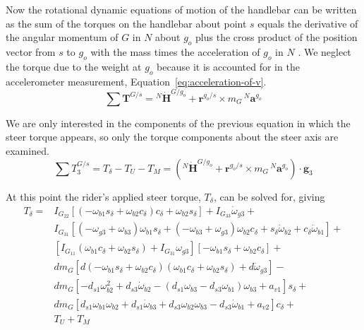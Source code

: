 \documentclass[10pt]{article}
\begin{document}
Now the rotational dynamic equations of motion of the handlebar can be written
as the sum of the torques on the handlebar about point $s$ equals the
derivative of the angular momentum of $G$ in $N$ about $g_o$ plus the cross
product of the position vector from $s$ to $g_o$ with the mass times the
acceleration of $g_o$ in $N$ \cite{Meriam1975}. We neglect the torque due to
the weight at $g_o$ because it is accounted for in the accelerometer
measurement, Equation~\ref{eq:acceleration-of-v}.
%
\begin{equation}
  \sum \mathbf{T}^{G/s} = {}^N\dot{\mathbf{H}}^{G/g_o} +
    \mathbf{r}^{g_o/s} \times m_G\,{}^N\mathbf{a}^{g_o}
\end{equation}

We are only interested in the components of the previous equation in which the
steer torque appears, so only the torque components about the steer axis are
examined.
%
\begin{equation}
  \sum T^{G/s}_3 = T_\delta - T_U - T_M = \left({}^N\dot{\mathbf{H}}^{G/g_o} +
  \mathbf{r}^{g_o/s} \times m_G\,{}^N\mathbf{a}^{g_o}\right) \cdot \hat{\mathbf{g}}_3
\end{equation}

At this point the rider's applied steer torque, $T_\delta$, can be solved for,
giving
%
\begin{align}
  T_{\delta} =
    & I_{G_{22}} \left[ \left( -\omega_{b1} s_\delta + \omega_{b2} c_\delta \right)
      c_\delta + \omega_{b2} s_\delta \right] + I_{G_{33}} \dot{\omega}_{g3} + \nonumber \\
    & I_{G_{31}} \left[ (-\omega_{g3} + \omega_{b3} ) \omega_{b1} s_\delta +
      (-\omega_{b3} + \omega_{g3}) \omega_{b2} c_\delta +
      s_\delta \dot{\omega}_{b2} + c_\delta \dot{\omega}_{b1} \right] + \nonumber \\
    & \left[ I_{G_{11}} (\omega_{b1} c_\delta + \omega_{b2}s_\delta) +
      I_{G_{31}} \omega_{g3} \right] \left[-\omega_{b1} s_\delta +
      \omega_{b2} c_\delta \right] + \nonumber \\
    & d m_G \left[ d (-\omega_{b1} s_\delta + \omega_{b2} c_\delta)
      (\omega_{b1} c_\delta + \omega_{b2} s_\delta) + d \dot{\omega}_{g3} \right] - \nonumber \\
    & d m_G \left[-d_{s1} \omega_{b2}^{2} + d_{s3} \dot{\omega}_{b2} -
      (d_{s1} \omega_{b3} - d_{s3} \omega_{b1}) \omega_{b3} + a_{v1} \right] s_\delta + \nonumber \\
    & d m_G \left[d_{s1} \omega_{b1} \omega_{b2} + d_{s1} \dot{\omega}_{b3} +
      d_{s3} \omega_{b2} \omega_{b3} - d_{s3} \dot{\omega}_{b1} + a_{v2} \right]
      c_\delta + \nonumber \\
    & T_U + T_M
    \label{eq:steer-torque}
\end{align}
\end{document}
